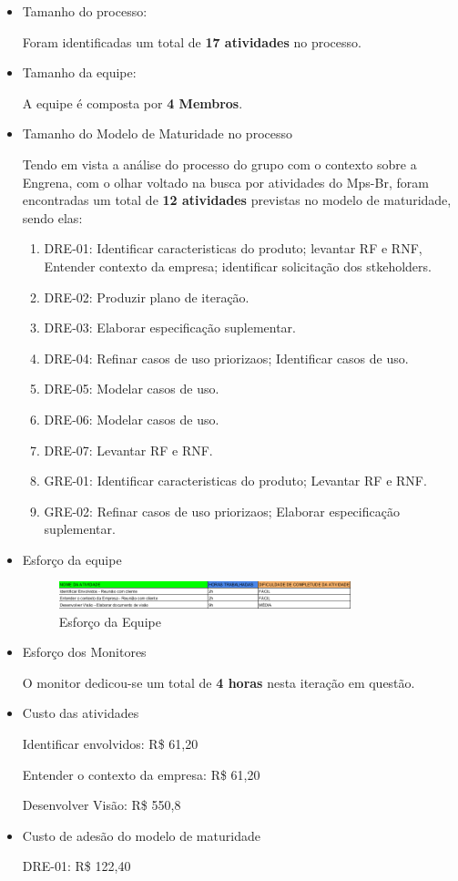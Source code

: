 \begin{itemize}
\item Tamanho do processo:

Foram identificadas um total de \textbf{17 atividades} no processo.

\item Tamanho da equipe:

A equipe é composta por \textbf{4 Membros}.

\item Tamanho do Modelo de Maturidade no processo

Tendo em vista a análise do processo do grupo com o contexto sobre a Engrena, com o olhar voltado na busca por atividades do Mps-Br, foram encontradas um total de \textbf{12 atividades} previstas no modelo de maturidade, sendo elas:
    \begin{enumerate}
    \item DRE-01: Identificar caracteristicas do produto; levantar RF  e RNF, Entender contexto da empresa; identificar solicitação dos stkeholders.
    \item DRE-02: Produzir plano de iteração.
    \item DRE-03: Elaborar especificação suplementar.
    \item DRE-04: Refinar casos de uso priorizaos; Identificar casos de uso.
    \item DRE-05: Modelar casos de uso.
    \item DRE-06: Modelar casos de uso.
    \item DRE-07: Levantar RF e RNF.
    \item GRE-01: Identificar caracteristicas do produto; Levantar RF e RNF.
    \item GRE-02: Refinar casos de uso priorizaos; Elaborar especificação suplementar.
    \end{enumerate}

\item Esforço da equipe

\begin{figure}[H]
  \center
  \includegraphics[width=0.8\textwidth]{figuras/esforco-eqp}
  \caption{Esforço da Equipe}
  \label{fig:esforco-eqp}
\end{figure}

\item Esforço dos Monitores

O monitor dedicou-se um total de \textbf{4 horas} nesta iteração em questão.

\item Custo das atividades

Identificar envolvidos: R\$ 61,20

Entender o contexto da empresa: R\$ 61,20

Desenvolver Visão: R\$ 550,8

\item Custo de adesão do modelo de maturidade

DRE-01: R\$ 122,40

\end{itemize}

